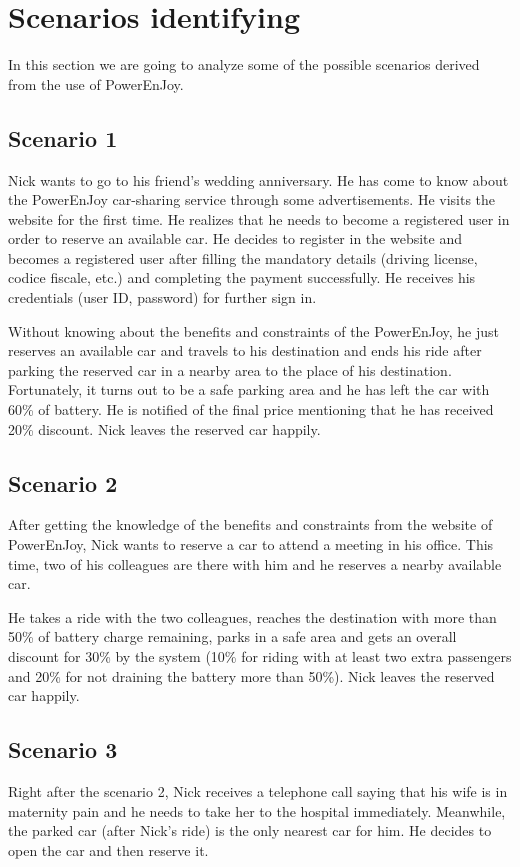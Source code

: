 \chapter{Scenarios identifying}
\label{chap:scenarios}
In this section we are going to analyze some of the possible scenarios derived from the use of PowerEnJoy.

\section{Scenario 1}
Nick wants to go to his friend's wedding anniversary. He has come to know about the PowerEnJoy car-sharing service through some advertisements. He visits the website for the first time. He realizes that he needs to become a registered user in order to reserve an available car. He decides to register in the website and becomes a registered user after filling the mandatory details (driving license, codice fiscale, etc.) and completing the payment successfully. He receives his credentials (user ID, password) for further sign in.

Without knowing about the benefits and constraints of the PowerEnJoy, he just reserves an available car and travels to his destination and ends his ride after parking the reserved car in a nearby area to the place of his destination. Fortunately, it turns out to be a safe parking area and he has left the car with 60\% of battery. He is notified of the final price mentioning that he has received 20\% discount. Nick leaves the reserved car happily.

\section{Scenario 2}
After getting the knowledge of the benefits and constraints from the website of PowerEnJoy, Nick wants to reserve a car to attend a meeting in his office. This time, two of his colleagues are there with him and he reserves a nearby available car.

He takes a ride with the two colleagues, reaches the destination with more than 50\% of battery charge remaining, parks in a safe area and gets an overall discount for 30\% by the system (10\% for riding with at least two extra passengers and 20\% for not draining the battery more than 50\%). Nick leaves the reserved car happily.

\section{Scenario 3}
Right after the scenario 2, Nick receives a telephone call saying that his wife is in maternity pain and he needs to take her to the hospital immediately. Meanwhile, the parked car (after Nick's ride) is the only nearest car for him. He decides to open the car and then reserve it.


